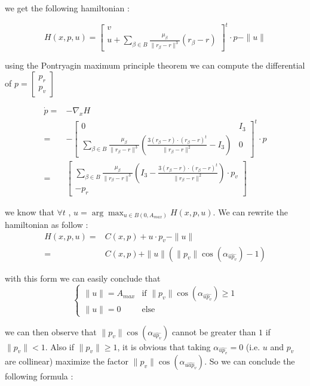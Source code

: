 \documentclass{article} %
\begin{document}
{			we get the following hamiltonian :
			
			$$
			H(x,p,u)=\begin{bmatrix}
				v\\
				u+\sum\limits _{\beta \in B }\frac{\mu _{\beta }}{\| r_{\beta } -r\| ^{3}}( r_{\beta } -r)
			\end{bmatrix}^t\cdot p-\|u\|
			$$
			
			using the Pontryagin maximum principle theorem we can compute the differential of $p=\begin{bmatrix}p_r\\p_v\end{bmatrix}$
			
			$$
			\begin{align}
				\dot{p}=&-\nabla _{x}H\\
				=&-\begin{bmatrix}
					0 & I_3\\
					\sum\limits _{\beta \in B }\frac{\mu _{\beta }}{\| r_{\beta } -r\| ^{3}}\left(\frac{3( r_{\beta } -r) \cdot ( r_{\beta } -r)^{t}}{\| r_{\beta } -r\| ^{2}} -I_3\right) & 0
				\end{bmatrix}^{t} \cdot p\\
				=&\begin{bmatrix}
					\sum\limits _{\beta \in B }\frac{\mu _{\beta }}{\| r_{\beta } -r\| ^{3}}\left(I_3-\frac{3( r_{\beta } -r) \cdot ( r_{\beta } -r)^{t}}{\| r_{\beta } -r\| ^{2}} \right)\cdot p_v\\
					-p_r
				\end{bmatrix}
			\end{align}
			$$
			
			we know that $\forall t$ , $u=\arg\max_{u\in B(0,A_{max})}H(x,p,u)$. We can rewrite the hamiltonian as follow : 
			$$
			\begin{align}
				H(x,p,u)=&C(x,p)+u\cdot p_v-\|u\| \\
				=&C(x,p)+\|u\|(\|p_v\|\cos(\alpha_{\widehat{up_v}})-1)
			\end{align}
			$$ 
			
			with this form we can easily conclude that 
			$$
			\begin{cases}
				\| u\| =A_{max} & \text{if } \|p_v\|\cos(\alpha_{\widehat{up_v}})\ge1\\
				\| u\| =0 & \text{else}
			\end{cases}
			$$
			
			we can then observe that $\|p_v\|\cos(\alpha_{\widehat{ap_v}})$ cannot be greater than $1$ if $\|p_v\| < 1$. Also if $\|p_v\| \ge 1$, it is obvious that taking $\alpha_{\widehat{up_v}}=0$ (i.e. $u$ and $p_v$ are collinear) maximize the factor $\|p_v\|\cos(\alpha_{\widehat{uap_v}})$. So we can conclude the following formula :
			
}
\end{document}
